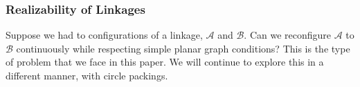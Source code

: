 \subsubsection{Realizability of Linkages}
Suppose we had to configurations of a linkage, $\mathcal{A}$ and $\mathcal{B}$.  Can we reconfigure $\mathcal{A}$ to $\mathcal{B}$ continuously while respecting simple planar graph conditions?  This is the type of problem that we face in this paper.  We will continue to explore this in a different manner, with circle packings.
